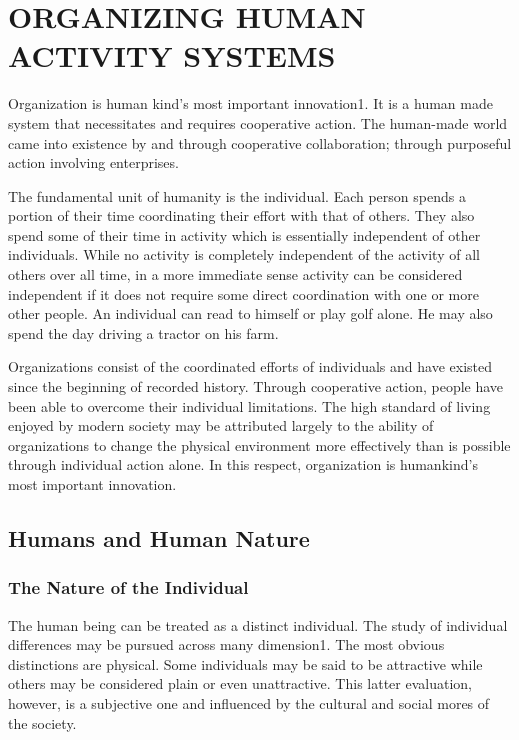 \chapter{ORGANIZING HUMAN ACTIVITY SYSTEMS}\label{chap:3}

Organization is human kind’s most important innovation1. It is a human made system that necessitates and requires cooperative action. The human-made world came into existence by and through cooperative collaboration; through purposeful action involving enterprises.

The fundamental unit of humanity is the individual. Each person spends a portion of their time coordinating their effort with that of others. They also spend some of their time in activity which is essentially independent of other individuals. While no activity is completely independent of the activity of all others over all time, in a more immediate sense activity can be considered independent if it does not require some direct coordination with one or more other people. An individual can read to himself or play golf alone. He may also spend the day driving a tractor on his farm.

Organizations consist of the coordinated efforts of individuals and have existed since the beginning of recorded history. Through cooperative action, people have been able to overcome their individual limitations. The high standard of living enjoyed by modern society may be attributed largely to the ability of organizations to change the physical environment more effectively than is possible through individual action alone. In this respect, organization is humankind’s most important innovation.

\section{Humans and Human Nature}

\subsection{The Nature of the Individual}

The human being can be treated as a distinct individual. The study of individual differences may be pursued across many dimension1. The most obvious distinctions are physical. Some individuals may be said to be attractive while others may be considered plain or even unattractive. This latter evaluation, however, is a subjective one and influenced by the cultural and social mores of the society.

